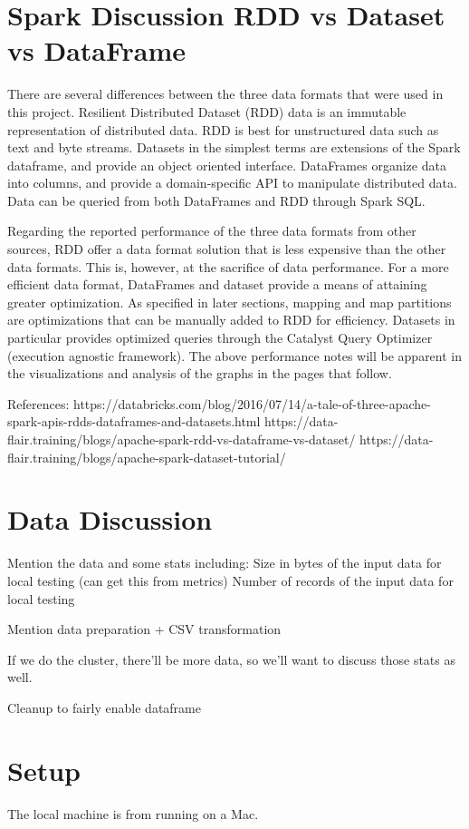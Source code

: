 \documentclass[conference]{IEEEtran}
\begin{document}
\section{Spark Discussion RDD vs Dataset vs DataFrame}


There are several differences between the three data formats that were used in this project.
Resilient Distributed Dataset (RDD) data is an immutable representation of distributed data.
RDD is best for unstructured data such as text and byte streams.
Datasets in the simplest terms are extensions of the Spark dataframe, and provide an object oriented interface.
DataFrames organize data into columns, and provide a domain-specific API to manipulate distributed data.
Data can be queried from both DataFrames and RDD through Spark SQL.

Regarding the reported performance of the three data formats from other sources,
RDD offer a data format solution that is less expensive than the other data formats.
This is, however, at the sacrifice of data performance. For a more efficient data format, DataFrames and dataset provide
a means of attaining greater optimization.
As specified in later sections, mapping and map partitions are optimizations that can be manually added to RDD
for efficiency.
Datasets in particular provides optimized queries through the Catalyst Query Optimizer (execution agnostic framework).
The above performance notes will be apparent in the visualizations and analysis of the graphs in the pages that follow.

References:
https://databricks.com/blog/2016/07/14/a-tale-of-three-apache-spark-apis-rdds-dataframes-and-datasets.html
https://data-flair.training/blogs/apache-spark-rdd-vs-dataframe-vs-dataset/
https://data-flair.training/blogs/apache-spark-dataset-tutorial/

\section{Data Discussion}
Mention the data and some stats including:
Size in bytes of the input data for local testing (can get this from metrics)
Number of records of the input data for local testing

Mention data preparation + CSV transformation

If we do the cluster, there'll be more data, so we'll want to discuss those stats as well.

Cleanup to fairly enable dataframe


\section{Setup}
The local machine is from running on a Mac.
\end{document}
